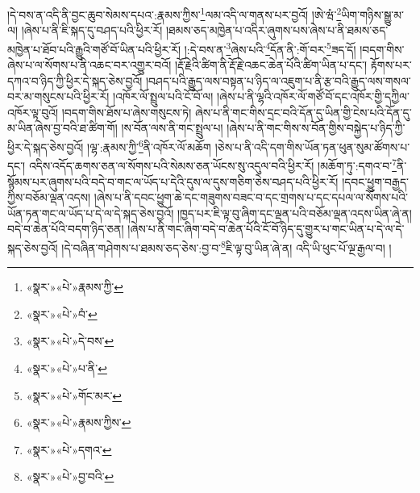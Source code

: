།དེ་བས་ན་འདི་ནི་བྱང་ཆུབ་སེམས་དཔའ་:རྣམས་ཀྱིས་\footnote{«སྣར་»«པེ་»རྣམས་ཀྱི་}ལམ་འདི་ལ་གནས་པར་བྱའོ། །ཨེ་ཝཾ་\footnote{«སྣར་»«པེ་»བཾ་}ཡིག་གཉིས་སྒྱུ་མ་ལ། །ཞེས་པ་ནི་ཇི་སྐད་དུ་བཤད་པའི་ཕྱིར་རོ། །ཐམས་ཅད་མཁྱེན་པ་འདིར་ཞུགས་པས་ཞེས་པ་ནི་ཐམས་ཅད་མཁྱེན་པ་ཐོབ་པའི་རྒྱུའི་གཙོ་བོ་ཡིན་པའི་ཕྱིར་རོ། །:དེ་བས་ན་\footnote{«སྣར་»«པེ་»དེ་བས་}ཞེས་པའི་\footnote{«སྣར་»«པེ་»པ་ནི་}དོན་ནི་:གོ་བར་\footnote{«སྣར་»«པེ་»གོང་མར་}ཟད་དོ། །བདག་གིས་ཞེས་པ་ལ་སོགས་པ་ནི་འཆང་བར་འགྱུར་བའོ། །རྡོ་རྗེའི་ཚིག་ནི་རྡོ་རྗེ་འཆང་ཆེན་པོའི་ཚིག་ཡིན་པ་དང་། རྟོགས་པར་དཀའ་བ་ཉིད་ཀྱི་ཕྱིར་དེ་སྐད་ཅེས་བྱའོ། །བཤད་པའི་རྒྱུད་ལས་བསྟན་པ་ཉིད་ལ་འཇུག་པ་ནི་རྩ་བའི་རྒྱུད་ལས་གསལ་བར་མ་གསུངས་པའི་ཕྱིར་རོ། །འཁོར་ལོ་སྤྲུལ་པའི་ངོ་བོ་ལ། །ཞེས་པ་ནི་ལྷའི་འཁོར་ལོ་གཙོ་བོ་དང་འཁོར་གྱི་དཀྱིལ་འཁོར་ལྟ་བུའོ། །བདག་གིས་ཐོས་པ་ཞེས་གསུངས་ཏེ། ཞེས་པ་ནི་གང་གིས་དྲང་བའི་དོན་དུ་ཡིན་གྱི་ངེས་པའི་དོན་དུ་མ་ཡིན་ཞེས་བྱ་བའི་ཐ་ཚིག་གོ། །ས་བོན་ལས་ནི་གང་སྤྲུལ་པ། །ཞེས་པ་ནི་གང་གིས་ས་བོན་གྱིས་བསྐྱེད་པ་ཉིད་ཀྱི་ཕྱིར་དེ་སྐད་ཅེས་བྱའོ། །ལྷ་:རྣམས་ཀྱི་\footnote{«སྣར་»«པེ་»རྣམས་ཀྱིས་}ནི་འཁོར་ལོ་མཆོག །ཅེས་པ་ནི་འདི་དག་གིས་ཡོན་ཏན་ཕུན་སུམ་ཚོགས་པ་དང་། འདིས་འདོད་ཆགས་ཅན་ལ་སོགས་པའི་སེམས་ཅན་ཡོངས་སུ་འདུལ་བའི་ཕྱིར་རོ། །མཆོག་ཏུ་:དགའ་བ་\footnote{«སྣར་»«པེ་»དགའ་}ནི་སྙོམས་པར་ཞུགས་པའི་བདེ་བ་གང་ལ་ཡོད་པ་དེའི་དུས་ལ་དུས་གཅིག་ཅེས་བཤད་པའི་ཕྱིར་རོ། །དབང་ཕྱུག་བརྒྱད་ཀྱིས་བཅོམ་ལྡན་འདས། །ཞེས་པ་ནི་དབང་ཕྱུག་ཆེ་དང་གཟུགས་བཟང་བ་དང་གྲགས་པ་དང་དཔལ་ལ་སོགས་པའི་ཡོན་ཏན་གང་ལ་ཡོད་པ་དེ་ལ་དེ་སྐད་ཅེས་བྱའོ། །ཁྱད་པར་ཇི་ལྟ་བུ་ཞིག་དང་ལྡན་པའི་བཅོམ་ལྡན་འདས་ཡིན་ཞེ་ན། བདེ་བ་ཆེན་པོའི་བདག་ཉིད་ཅན། །ཞེས་པ་ནི་གང་ཞིག་བདེ་བ་ཆེན་པོའི་ངོ་བོ་ཉིད་དུ་གྱུར་པ་གང་ཡིན་པ་དེ་ལ་དེ་སྐད་ཅེས་བྱའོ། །དེ་བཞིན་གཤེགས་པ་ཐམས་ཅད་ཅེས་:བྱ་བ་\footnote{«སྣར་»«པེ་»བྱ་བའི་}ཇི་ལྟ་བུ་ཡིན་ཞེ་ན། འདི་ཡི་ཕུང་པོ་ལྔ་རྒྱལ་བ། །

